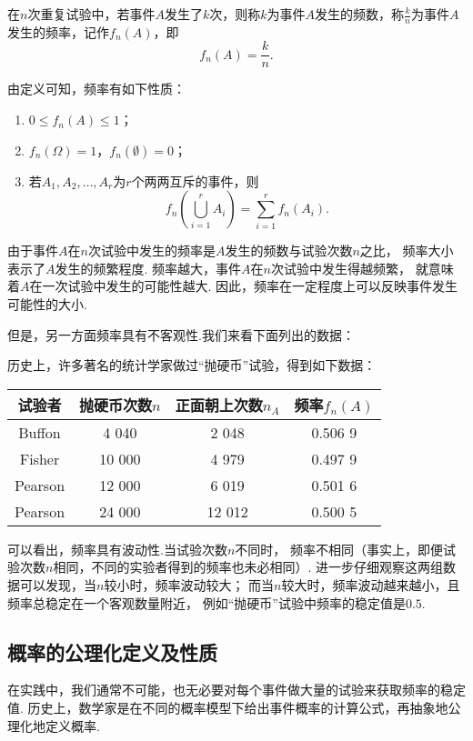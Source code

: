 \begin{definition}
在\(n\)次重复试验中，若事件\(A\)发生了\(k\)次，则称\(k\)为事件\(A\)发生的频数，称\(\frac{k}{n}\)为事件\(A\)发生的频率，记作\(f_n(A)\)，即\[
f_n(A) = \frac{k}{n}.
\]
\end{definition}

\begin{property}
由定义可知，频率有如下性质：\begin{enumerate}
\item \(0 \leq f_n(A) \leq 1\)；
\item \(f_n(\Omega) = 1\)，\(f_n(\emptyset) = 0\)；
\item 若\(A_1,A_2,\dotsc,A_r\)为\(r\)个两两互斥的事件，则\[
f_n\left( \bigcup_{i=1}^r A_i \right)
= \sum\limits_{i=1}^r f_n(A_i).
\]
\end{enumerate}
\end{property}

由于事件\(A\)在\(n\)次试验中发生的频率是\(A\)发生的频数与试验次数\(n\)之比，
频率大小表示了\(A\)发生的频繁程度.
频率越大，事件\(A\)在\(n\)次试验中发生得越频繁，
就意味着\(A\)在一次试验中发生的可能性越大.
因此，频率在一定程度上可以反映事件发生可能性的大小.

但是，另一方面频率具有不客观性.我们来看下面列出的数据：
\begin{example}
历史上，许多著名的统计学家做过“抛硬币”试验，得到如下数据：
\begin{center}
	\begin{tabular}{c|c|c|c}
	\hline
	试验者 & 抛硬币次数\(n\) & 正面朝上次数\(n_A\) & 频率\(f_n(A)\) \\ \hline
	Buffon & 4 040 & 2 048 & 0.506 9 \\
	Fisher & 10 000 & 4 979 & 0.497 9 \\
	Pearson & 12 000 & 6 019 & 0.501 6 \\
	Pearson & 24 000 & 12 012 & 0.500 5 \\ \hline
	\end{tabular}
\end{center}
\end{example}
可以看出，频率具有波动性.当试验次数\(n\)不同时，
频率不相同（事实上，即便试验次数\(n\)相同，不同的实验者得到的频率也未必相同）.
进一步仔细观察这两组数据可以发现，当\(n\)较小时，频率波动较大；
而当\(n\)较大时，频率波动越来越小，且频率总稳定在一个客观数量附近，
例如“抛硬币”试验中频率的稳定值是\(0.5\).

\subsection{概率的公理化定义及性质}
在实践中，我们通常不可能，也无必要对每个事件做大量的试验来获取频率的稳定值.
历史上，数学家是在不同的概率模型下给出事件概率的计算公式，再抽象地公理化地定义概率.

